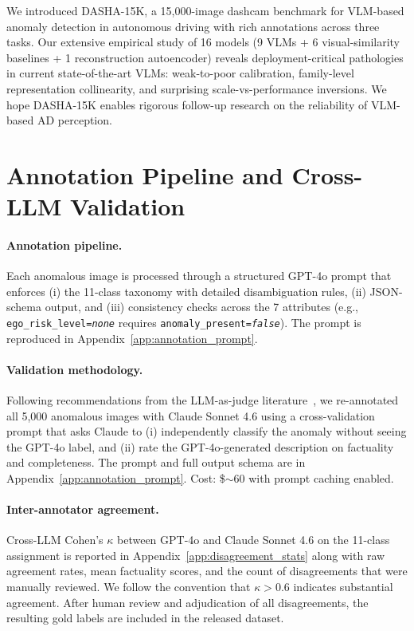 \documentclass{article}
\newcommand{\bench}{\textsc{DASHA-15K}\xspace}
\begin{document}
We introduced \bench, a 15{,}000-image dashcam benchmark for
VLM-based anomaly detection in autonomous driving with rich
annotations across three tasks. Our extensive empirical study of 16
models (9 VLMs + 6 visual-similarity baselines + 1 reconstruction
autoencoder) reveals deployment-critical pathologies in current
state-of-the-art VLMs: weak-to-poor calibration, family-level
representation collinearity, and surprising scale-vs-performance
inversions. We hope \bench enables rigorous follow-up research on
the reliability of VLM-based AD perception.




\appendix

\section{Annotation Pipeline and Cross-LLM Validation}
\label{app:validation}

\paragraph{Annotation pipeline.}
Each anomalous image is processed through a structured GPT-4o prompt
that enforces (i) the 11-class taxonomy with detailed disambiguation
rules, (ii) JSON-schema output, and (iii) consistency checks across
the 7 attributes (e.g.,
\texttt{ego\_risk\_level=\textit{none}} requires
\texttt{anomaly\_present=\textit{false}}). The prompt is reproduced
in Appendix~\ref{app:annotation_prompt}.

\paragraph{Validation methodology.}
Following recommendations from the LLM-as-judge
literature~\citep{judgebench, llm_judge_survey}, we re-annotated
all 5{,}000 anomalous images with Claude Sonnet 4.6 using a
cross-validation prompt that asks Claude to (i) independently classify
the anomaly without seeing the GPT-4o label, and (ii) rate the
GPT-4o-generated description on factuality and completeness. The
prompt and full output schema are in
Appendix~\ref{app:annotation_prompt}. Cost: \$$\sim$60 with prompt
caching enabled.

\paragraph{Inter-annotator agreement.}
Cross-LLM Cohen's $\kappa$ between GPT-4o and Claude Sonnet 4.6 on
the 11-class assignment is reported in
Appendix~\ref{app:disagreement_stats} along with raw agreement rates,
mean factuality scores, and the count of disagreements that were
manually reviewed. We follow the convention that
$\kappa > 0.6$ indicates substantial agreement. After human review
and adjudication of all disagreements, the resulting gold labels are
included in the released dataset.
\end{document}
